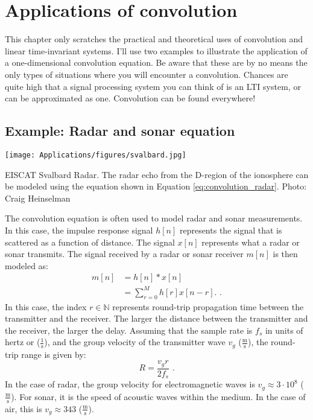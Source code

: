 \section{Applications of convolution}

This chapter only scratches the practical and theoretical uses of
convolution and linear time-invariant systems. I'll use two examples
to illustrate the application of a one-dimensional convolution
equation. Be aware that these are by no means the only types of
situations where you will encounter a convolution. Chances are quite
high that a signal processing system you can think of is an LTI
system, or can be approximated as one. Convolution can be found
everywhere!

\subsection{Example: Radar and sonar equation}

\begin{marginfigure}
\begin{center}
\texttt{[image: Applications/figures/svalbard.jpg]}
\end{center}
\caption{EISCAT Svalbard Radar. The radar echo from the D-region of the ionosphere can be modeled using the equation shown in Equation \ref{eq:convolution_radar}. Photo: Craig Heinselman}
\label{fig:eiscat_svalbard}
\end{marginfigure}
The convolution equation is often used to model radar and sonar
measurements. In this case, the impulse response signal $h[n]$
represents the signal that is scattered as a function of distance. The
signal $x[n]$ represents what a radar or sonar transmits. The signal
received by a radar or sonar receiver $m[n]$ is then modeled as:
\begin{align}
m[n] &=  h[n]*x[n]\\
     &= \sum_{r=0}^{M} h[r] x[n-r]. \label{eq:convolution_radar}\,\,.
\end{align}
In this case, the index $r \in \mathbb{N}$ represents round-trip
propagation time between the transmitter and the receiver. The larger
the distance between the transmitter and the receiver, the larger the
delay. Assuming that the sample rate is $f_s$ in units of hertz or
($\frac{1}{\mathrm{s}}$), and the group velocity of the transmitter
wave $v_g$ ($\frac{\mathrm{m}}{\mathrm{s}}$), the round-trip range is given by:
\begin{equation}
R = \frac{v_g r}{2 f_s}\,\,.
\end{equation}
In the case of radar, the group velocity for electromagnetic waves is
$v_g \approx 3 \cdot 10^8$ ($\frac{\mathrm{m}}{\mathrm{s}}$). For sonar, it is the speed of
acoustic waves within the medium. In the case of air, this is
$v_g \approx 343$ ($\frac{\mathrm{m}}{\mathrm{s}}$).

